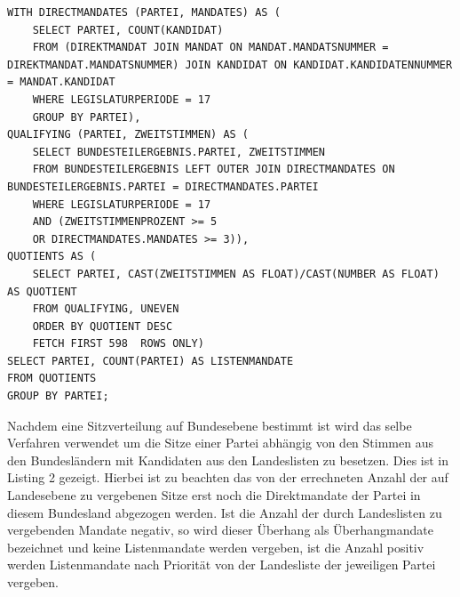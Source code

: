 \documentclass[a4paper]{article}
\begin{document}
\lstset{
language=SQL,
basicstyle=\footnotesize,       %
numbers=left,                   %
numberstyle=\footnotesize,      %
stepnumber=2,                   %
numbersep=5pt,                  %
showspaces=false,               %
showstringspaces=false,         %
frame=single,	                %
tabsize=2,	                %
captionpos=b,                   %
breaklines=true                %
}
\begin{lstlisting}[caption=Bestimmung der Mandate für die 17. Legislaturperiode]
WITH DIRECTMANDATES (PARTEI, MANDATES) AS (
	SELECT PARTEI, COUNT(KANDIDAT)
	FROM (DIREKTMANDAT JOIN MANDAT ON MANDAT.MANDATSNUMMER = DIREKTMANDAT.MANDATSNUMMER) JOIN KANDIDAT ON KANDIDAT.KANDIDATENNUMMER = MANDAT.KANDIDAT
	WHERE LEGISLATURPERIODE = 17
	GROUP BY PARTEI),
QUALIFYING (PARTEI, ZWEITSTIMMEN) AS (
	SELECT BUNDESTEILERGEBNIS.PARTEI, ZWEITSTIMMEN    
	FROM BUNDESTEILERGEBNIS LEFT OUTER JOIN DIRECTMANDATES ON BUNDESTEILERGEBNIS.PARTEI = DIRECTMANDATES.PARTEI
	WHERE LEGISLATURPERIODE = 17
	AND (ZWEITSTIMMENPROZENT >= 5
	OR DIRECTMANDATES.MANDATES >= 3)),
QUOTIENTS AS (
	SELECT PARTEI, CAST(ZWEITSTIMMEN AS FLOAT)/CAST(NUMBER AS FLOAT) AS QUOTIENT
	FROM QUALIFYING, UNEVEN
	ORDER BY QUOTIENT DESC
	FETCH FIRST 598  ROWS ONLY)
SELECT PARTEI, COUNT(PARTEI) AS LISTENMANDATE
FROM QUOTIENTS
GROUP BY PARTEI;
\end{lstlisting}

Nachdem eine Sitzverteilung auf Bundesebene bestimmt ist wird das selbe Verfahren verwendet um die Sitze einer Partei abhängig von den Stimmen aus den Bundesländern mit Kandidaten aus den Landeslisten zu besetzen. Dies ist in Listing 2 gezeigt. Hierbei ist zu beachten das von der errechneten Anzahl der auf Landesebene zu vergebenen Sitze erst noch die Direktmandate der Partei in diesem Bundesland abgezogen werden. Ist die Anzahl der durch Landeslisten zu vergebenden Mandate negativ, so wird dieser Überhang als Überhangmandate bezeichnet und keine Listenmandate werden vergeben, ist die Anzahl positiv werden Listenmandate nach Priorität von der Landesliste der jeweiligen Partei vergeben.
\end{document}
